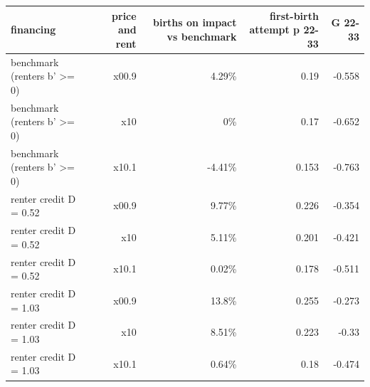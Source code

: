 \begin{tabular}{lrrrr}
\toprule
financing & price and rent & births on impact vs benchmark & first-birth attempt p 22-33 & G 22-33 \\
\midrule
benchmark (renters b' >= 0) & x00.9 & 4.29\% & 0.19 & -0.558 \\
benchmark (renters b' >= 0) & x10 & 0\% & 0.17 & -0.652 \\
benchmark (renters b' >= 0) & x10.1 & -4.41\% & 0.153 & -0.763 \\
renter credit D = 0.52 & x00.9 & 9.77\% & 0.226 & -0.354 \\
renter credit D = 0.52 & x10 & 5.11\% & 0.201 & -0.421 \\
renter credit D = 0.52 & x10.1 & 0.02\% & 0.178 & -0.511 \\
renter credit D = 1.03 & x00.9 & 13.8\% & 0.255 & -0.273 \\
renter credit D = 1.03 & x10 & 8.51\% & 0.223 & -0.33 \\
renter credit D = 1.03 & x10.1 & 0.64\% & 0.18 & -0.474 \\
\bottomrule
\end{tabular}
